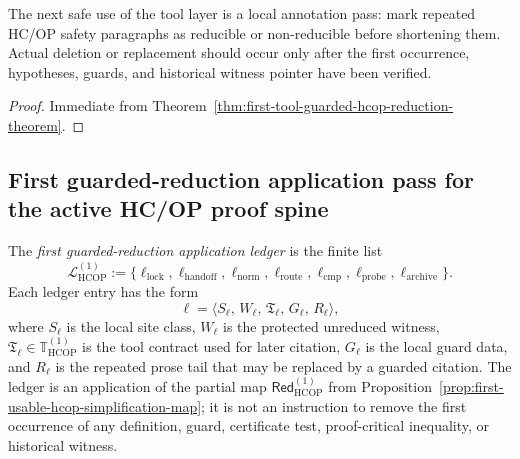 \begin{corollary}
\label{cor:v3340-r11-working-rule}
The next safe use of the tool layer is a local annotation pass: mark repeated HC/OP safety paragraphs as reducible or non-reducible before shortening them. Actual deletion or replacement should occur only after the first occurrence, hypotheses, guards, and historical witness pointer have been verified.
\end{corollary}

\begin{proof}
Immediate from Theorem~\ref{thm:first-tool-guarded-hcop-reduction-theorem}.
\end{proof}



\subsection{First guarded-reduction application pass for the active HC/OP proof spine}
\label{subsec:first-guarded-reduction-application-pass-active-hcop-proof-spine}

\begin{definition}
\label{def:first-guarded-reduction-application-ledger}
The \emph{first guarded-reduction application ledger} is the finite list
\[
  \mathcal L_{\mathrm{HCOP}}^{(1)}
  :=
  \{\ell_{\mathrm{lock}},\ell_{\mathrm{handoff}},\ell_{\mathrm{norm}},
    \ell_{\mathrm{route}},\ell_{\mathrm{cmp}},\ell_{\mathrm{probe}},
    \ell_{\mathrm{archive}}\}.
\]
Each ledger entry has the form
\[
  \ell
  =
  \langle S_{\ell},\, W_{\ell},\, \mathfrak T_{\ell},\,
  G_{\ell},\, R_{\ell}\rangle,
\]
where \(S_{\ell}\) is the local site class, \(W_{\ell}\) is the protected unreduced witness, \(\mathfrak T_{\ell}\in\mathbb T_{\mathrm{HCOP}}^{(1)}\) is the tool contract used for later citation, \(G_{\ell}\) is the local guard data, and \(R_{\ell}\) is the repeated prose tail that may be replaced by a guarded citation.  The ledger is an application of the partial map \(\mathsf{Red}_{\mathrm{HCOP}}^{(1)}\) from Proposition~\ref{prop:first-usable-hcop-simplification-map}; it is not an instruction to remove the first occurrence of any definition, guard, certificate test, proof-critical inequality, or historical witness.
\end{definition}

